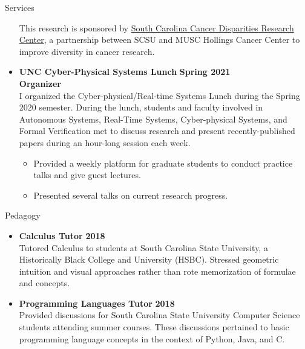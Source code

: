 \documentclass{resume} %
\begin{document}
\begin{rSection}{Services}
\begin{itemize}[leftmargin=*]
      This research is sponsored by \href{https://hollingscancercenter.musc.edu/outreach/statewide-commitments/sc-cadre}{South Carolina Cancer Disparities Research Center}, a partnership between SCSU and MUSC Hollings Cancer Center to improve diversity in cancer research.

      \item
      {\bf UNC Cyber-Physical Systems Lunch } \hfill {\bf Spring 2021}\\
      {\bf Organizer} \\
      I organized the Cyber-physical/Real-time Systems Lunch during the Spring 2020 semester. During the lunch, students and faculty involved in Autonomous Systems, Real-Time Systems, Cyber-physical Systems, and Formal Verification met to discuss research and present recently-published papers during an hour-long session each week.
      \begin{itemize}[label=$\blackdiamond$]
        \item Provided a weekly platform for graduate students to conduct practice talks and give guest lectures.
        \item Presented several talks on current research progress.
      \end{itemize}
\end{itemize}
\end{rSection}

\begin{rSection}{Pedagogy}
  \begin{itemize}[leftmargin=*]
    \item {\bf Calculus Tutor} \hfill {\bf 2018} \\
    Tutored Calculus to students at South Carolina State University, a Historically Black College and University (HSBC). Stressed geometric intuition and visual approaches rather than rote memorization of formulae and concepts.

    \item {\bf Programming Languages Tutor} \hfill {\bf 2018} \\
    Provided discussions for South Carolina State University Computer Science students attending summer courses. These discussions pertained to basic programming language concepts in the context of Python, Java, and C. \\
  \end{itemize}
\end{rSection}
\end{document}
